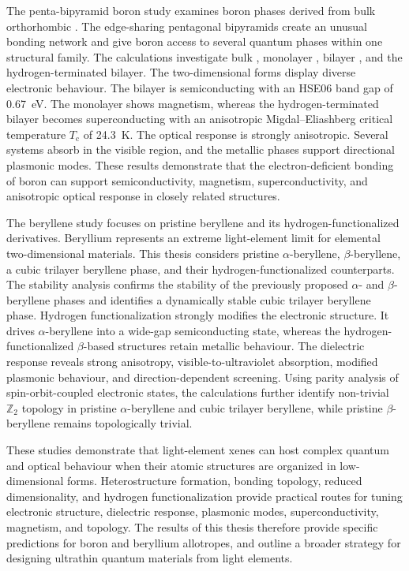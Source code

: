 The penta-bipyramid boron study examines boron phases derived from bulk orthorhombic .
The edge-sharing pentagonal bipyramids create an unusual bonding network and give boron access to several quantum phases within one structural family.
The calculations investigate bulk , monolayer , bilayer , and the hydrogen-terminated bilayer.
The two-dimensional forms display diverse electronic behaviour.
The bilayer is semiconducting with an HSE06 band gap of \qty{0.67}{\electronvolt}.
The monolayer shows magnetism, whereas the hydrogen-terminated bilayer becomes superconducting with an anisotropic Migdal--Eliashberg critical temperature $T_\mathrm{c}$ of \qty{24.3}{\kelvin}.
The optical response is strongly anisotropic.
Several systems absorb in the visible region, and the metallic phases support directional plasmonic modes.
These results demonstrate that the electron-deficient bonding of boron can support semiconductivity, magnetism, superconductivity, and anisotropic optical response in closely related structures.

The beryllene study focuses on pristine beryllene and its hydrogen-functionalized derivatives.
Beryllium represents an extreme light-element limit for elemental two-dimensional materials.
This thesis considers pristine $\alpha$-beryllene, $\beta$-beryllene, a cubic trilayer beryllene phase, and their hydrogen-functionalized counterparts.
The stability analysis confirms the stability of the previously proposed $\alpha$- and $\beta$-beryllene phases and identifies a dynamically stable cubic trilayer beryllene phase.
Hydrogen functionalization strongly modifies the electronic structure.
It drives $\alpha$-beryllene into a wide-gap semiconducting state, whereas the hydrogen-functionalized $\beta$-based structures retain metallic behaviour.
The dielectric response reveals strong anisotropy, visible-to-ultraviolet absorption, modified plasmonic behaviour, and direction-dependent screening.
Using parity analysis of spin-orbit-coupled electronic states, the calculations further identify non-trivial $\mathbb{Z}_2$ topology in pristine $\alpha$-beryllene and cubic trilayer beryllene, while pristine $\beta$-beryllene remains topologically trivial.

These studies demonstrate that light-element xenes can host complex quantum and optical behaviour when their atomic structures are organized in low-dimensional forms.
Heterostructure formation, bonding topology, reduced dimensionality, and hydrogen functionalization provide practical routes for tuning electronic structure, dielectric response, plasmonic modes, superconductivity, magnetism, and topology.
The results of this thesis therefore provide specific predictions for boron and beryllium allotropes, and outline a broader strategy for designing ultrathin quantum materials from light elements.
